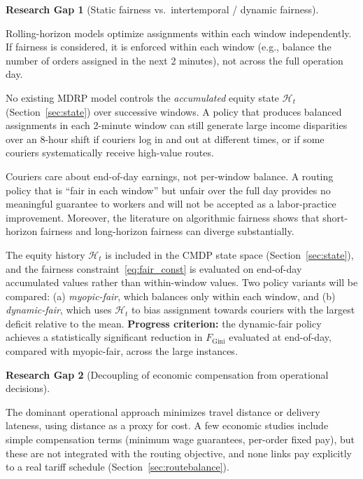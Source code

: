 \documentclass[12pt,a4paper]{report}
\newtheorem{gap}{Research Gap}
\begin{document}
\begin{gap}[Static fairness vs.\ intertemporal / dynamic fairness]
\label{gap:2}
\end{gap}
\hfill


Rolling-horizon models \citep{reyes2018meal,wen2010dynamic,martinez2024exploring} optimize assignments within each window independently. If fairness is considered, it is enforced within each window (e.g., balance the number of orders assigned in the next 2 minutes), not across the full operation day.


No existing MDRP model controls the \emph{accumulated} equity state $\mathcal{H}_t$ (Section~\ref{sec:state}) over successive windows. A policy that produces balanced assignments in each 2-minute window can still generate large income disparities over an 8-hour shift if couriers log in and out at different times, or if some couriers systematically receive high-value routes.


Couriers care about end-of-day earnings, not per-window balance. A routing policy that is ``fair in each window'' but unfair over the full day provides no meaningful guarantee to workers and will not be accepted as a labor-practice improvement. Moreover, the literature on algorithmic fairness \citep{lesmana2019balancing,corbettdavies2023measure} shows that short-horizon fairness and long-horizon fairness can diverge substantially.


The equity history $\mathcal{H}_t$ is included in the CMDP state space (Section~\ref{sec:state}), and the fairness constraint~\eqref{eq:fair_const} is evaluated on end-of-day accumulated values rather than within-window values. Two policy variants will be compared: (a) \emph{myopic-fair}, which balances only within each window, and (b) \emph{dynamic-fair}, which uses $\mathcal{H}_t$
to bias assignment towards couriers with the largest deficit relative to the mean.
\textbf{Progress criterion:} the dynamic-fair policy achieves a statistically significant reduction in $F_{\text{Gini}}$ evaluated at end-of-day, compared with myopic-fair, across the large instances.


\begin{gap}[Decoupling of economic compensation from operational decisions]
\label{gap:3}
\end{gap}
\hfill


The dominant operational approach \citep{reyes2018meal,steever2019dynamic,ulmer2021restaurant,
yildiz2019provably} minimizes travel distance or delivery lateness, using distance as a proxy for cost. A few economic studies \citep{wen2010dynamic,reyes2018meal} include simple compensation terms (minimum wage guarantees, per-order fixed pay), but these are not integrated with the routing objective, and none links pay explicitly to a real tariff schedule (Section~\ref{sec:routebalance}).
\end{document}
